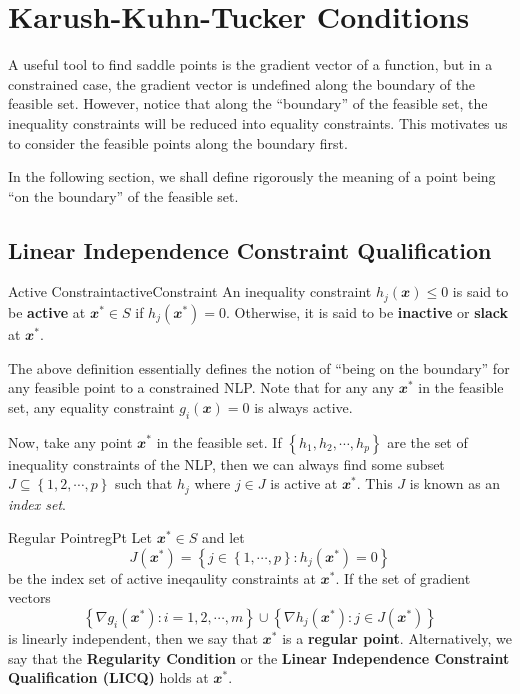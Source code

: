 \documentclass[math, code]{amznotes}
\theoremstyle{remark}
\begin{document}
\section{Karush-Kuhn-Tucker Conditions}
A useful tool to find saddle points is the gradient vector of a function, but in a constrained case, the gradient vector is undefined along the boundary of the feasible set. However, notice that along the ``boundary'' of the feasible set, the inequality constraints will be reduced into equality constraints. This motivates us to consider the feasible points along the boundary first.

In the following section, we shall define rigorously the meaning of a point being ``on the boundary'' of the feasible set.
\subsection{Linear Independence Constraint Qualification}
\begin{dfnbox}{Active Constraint}{activeConstraint}
    An inequality constraint $h_j(\mathbfit{x}) \leq 0$ is said to be {\color{red} \textbf{active}} at $\mathbfit{x}^* \in S$ if $h_j(\mathbfit{x}^*) = 0$. Otherwise, it is said to be {\color{red} \textbf{inactive}} or {\color{red} \textbf{slack}} at $\mathbfit{x}^*$.
\end{dfnbox}
The above definition essentially defines the notion of ``being on the boundary'' for any feasible point to a constrained NLP. Note that for any any $\mathbfit{x}^*$ in the feasible set, any equality constraint $g_i(\mathbfit{x}) = 0$ is always active.

Now, take any point $\mathbfit{x}^*$ in the feasible set. If $\left\{h_1, h_2, \cdots, h_p\right\}$ are the set of inequality constraints of the NLP, then we can always find some subset $J \subseteq \left\{1, 2, \cdots, p\right\}$ such that $h_j$ where $j \in J$ is active at $\mathbfit{x}^*$. This $J$ is known as an \textit{index set}.
\begin{dfnbox}{Regular Point}{regPt}
    Let $\mathbfit{x}^* \in S$ and let
    \begin{equation*}
        J(\mathbfit{x}^*) = \left\{j \in \left\{1, \cdots, p\right\} \colon h_j(\mathbfit{x}^*) = 0\right\}
    \end{equation*}
    be the index set of active ineqaulity constraints at $
    \mathbfit{x}^*$. If the set of gradient vectors
    \begin{equation*}
        \left\{\nabla g_i(\mathbfit{x}^*) \colon i = 1, 2, \cdots, m\right\} \cup \left\{\nabla h_j(\mathbfit{x}^*) \colon j \in J(\mathbfit{x}^*)\right\}
    \end{equation*}
    is linearly independent, then we say that $\mathbfit{x}^*$ is a {\color{red} \textbf{regular point}}. Alternatively, we say that the {\color{red} \textbf{Regularity Condition}} or the {\color{red} \textbf{Linear Independence Constraint Qualification (LICQ)}} holds at $\mathbfit{x}^*$.
\end{dfnbox}
\end{document}
